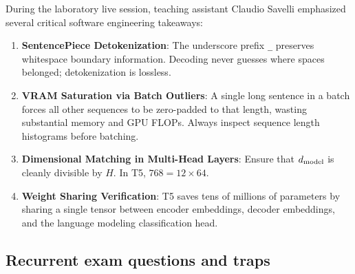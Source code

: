 \documentclass[../labs.tex]{subfiles}
\begin{document}
During the laboratory live session, teaching assistant Claudio Savelli emphasized several critical software engineering takeaways:
\begin{enumerate}
    \item \textbf{SentencePiece Detokenization}: The underscore prefix \texttt{\_} preserves whitespace boundary information. Decoding never guesses where spaces belonged; detokenization is lossless.
    \item \textbf{VRAM Saturation via Batch Outliers}: A single long sentence in a batch forces all other sequences to be zero-padded to that length, wasting substantial memory and GPU FLOPs. Always inspect sequence length histograms before batching.
    \item \textbf{Dimensional Matching in Multi-Head Layers}: Ensure that $d_{\text{model}}$ is cleanly divisible by $H$. In T5, $768 = 12 \times 64$.
    \item \textbf{Weight Sharing Verification}: T5 saves tens of millions of parameters by sharing a single tensor between encoder embeddings, decoder embeddings, and the language modeling classification head.
\end{enumerate}

\subsection{Recurrent exam questions and traps}
\end{document}
